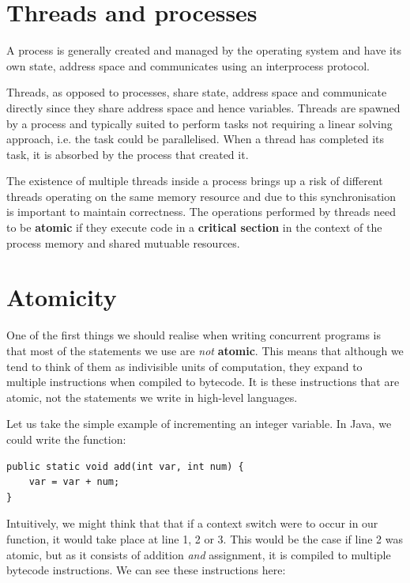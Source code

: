 \documentclass[a4paper,12pt]{kth-mag}
\begin{document}
\section{Threads and processes}
A process is generally created and managed by the operating system and have its own state, address space and communicates using an interprocess protocol.

Threads, as opposed to processes, share state, address space and communicate directly since they share address space and hence variables. Threads are spawned by a process and typically suited to perform tasks not requiring a linear solving approach, i.e. the task could be parallelised. When a thread has completed its task, it is absorbed by the process that created it.

The existence of multiple threads inside a process brings up a risk of different threads operating on the same memory resource and due to this synchronisation is important to maintain correctness. The operations performed by threads need to be \textbf{atomic} if they execute code in a \textbf{critical section} in the context of the process memory and shared mutuable resources.

\section{Atomicity}

One of the first things we should realise when writing concurrent programs is that most of the statements we use are \textit{not} \textbf{atomic}. This means that although we tend to think of them as indivisible units of computation, they expand to multiple instructions when compiled to bytecode. It is these instructions that are atomic, not the statements we write in high-level languages.

Let us take the simple example of incrementing an integer variable. In Java, we could write the function:

\begin{listing}[H]
\begin{verbatim}
public static void add(int var, int num) { 
	var = var + num; 
}
\end{verbatim}
\end{listing}

Intuitively, we might think that that if a context switch were to occur in our function, it would take place at line 1, 2 or 3. This would be the case if line 2 was atomic, but as it consists of addition \textit{and} assignment, it is compiled to multiple bytecode instructions. We can see these instructions here:
\end{document}
